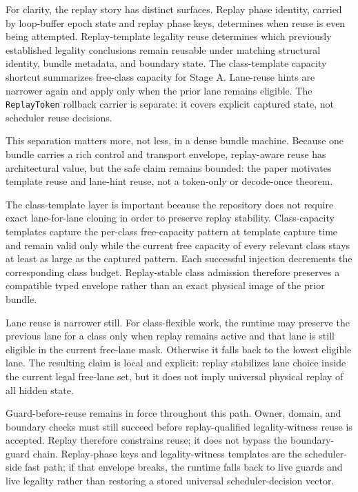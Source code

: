 \documentclass[twocolumn]{article}
\begin{document}
For clarity, the replay story has distinct surfaces. Replay phase identity, carried by loop-buffer epoch state and replay phase keys, determines when reuse is even being attempted. Replay-template legality reuse determines which previously established legality conclusions remain reusable under matching structural identity, bundle metadata, and boundary state. The class-template capacity shortcut summarizes free-class capacity for Stage A. Lane-reuse hints are narrower again and apply only when the prior lane remains eligible. The \texttt{ReplayToken} rollback carrier is separate: it covers explicit captured state, not scheduler reuse decisions.

This separation matters more, not less, in a dense bundle machine. Because one bundle carries a rich control and transport envelope, replay-aware reuse has architectural value, but the safe claim remains bounded: the paper motivates template reuse and lane-hint reuse, not a token-only or decode-once theorem.

The class-template layer is important because the repository does not require exact lane-for-lane cloning in order to preserve replay stability. Class-capacity templates capture the per-class free-capacity pattern at template capture time and remain valid only while the current free capacity of every relevant class stays at least as large as the captured pattern. Each successful injection decrements the corresponding class budget. Replay-stable class admission therefore preserves a compatible typed envelope rather than an exact physical image of the prior bundle.

Lane reuse is narrower still. For class-flexible work, the runtime may preserve the previous lane for a class only when replay remains active and that lane is still eligible in the current free-lane mask. Otherwise it falls back to the lowest eligible lane. The resulting claim is local and explicit: replay stabilizes lane choice inside the current legal free-lane set, but it does not imply universal physical replay of all hidden state.

Guard-before-reuse remains in force throughout this path. Owner, domain, and boundary checks must still succeed before replay-qualified legality-witness reuse is accepted. Replay therefore constrains reuse; it does not bypass the boundary-guard chain. Replay-phase keys and legality-witness templates are the scheduler-side fast path; if that envelope breaks, the runtime falls back to live guards and live legality rather than restoring a stored universal scheduler-decision vector.
\end{document}
